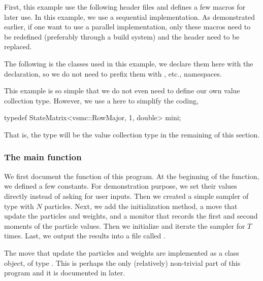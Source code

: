 First, this example use the following header files and defines a few macros
for later use.
In this example, we use a sequential implementation. As demonstrated earlier,
if one want to use a parallel implementation, only these macros need to be
redefined (preferably through a build system) and the header
 need to be replaced.

The following is the \vsmc classes used in this example, we declare them here
with the  declaration, so we do not need to prefix them with
, etc., namespaces.

This example is so simple that we do not even need to define our own value
collection type. However, we use a  here to simplify the coding,
\begin{cppcode}
typedef StateMatrix<vsmc::RowMajor, 1, double> mini;
\end{cppcode}
That is, the type  will be the value collection type in the
remaining of this section.

\subsubsection{The main function}
\label{ssub:The main function}

We first document the  function of this program.
At the beginning of the function, we defined a few constants. For
demonstration purpose, we set their values directly instead of asking for user
inputs. Then we created a simple sampler of type  with $N$
particles. Next, we add the initialization method, a move that update the
particles and weights, and a monitor that records the first and second moments
of the particle values. Then we initialize and iterate the sampler for $T$
times. Last, we output the results into a file called .

The move that update the particles and weights are implemented as a class
object, of type . This is perhaps the only (relatively)
non-trivial part of this program and it is documented in later.

